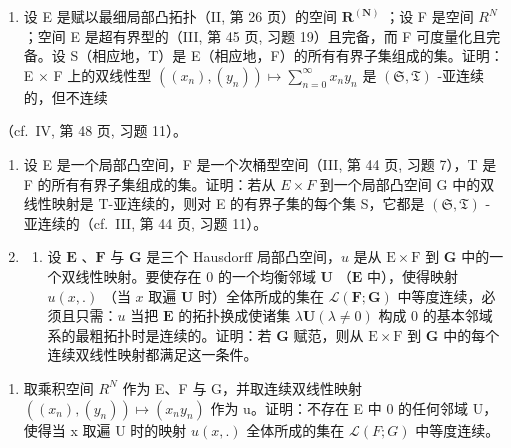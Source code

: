 \begin{enumerate}
\def\labelenumi{\arabic{enumi})}
\setcounter{enumi}{2}
\tightlist
\item
  设 E 是赋以最细局部凸拓扑（II, 第 26 页）的空间 \(\mathbf{R}^{(\mathbf{N})}\) ；设 F 是空间 \(R^{N}\) ；空间 E 是超有界型的（III, 第 45 页, 习题 19）且完备，而 F 可度量化且完备。设 S（相应地，T）是 E（相应地，F）的所有有界子集组成的集。证明：E × F 上的双线性型 \(((x_{n}), (y_{n})) \mapsto \sum_{n=0}^{\infty} x_{n} y_{n}\) 是 \((\mathfrak{S}, \mathfrak{T})\) -亚连续的，但不连续
\end{enumerate}

（cf.~IV, 第 48 页, 习题 11）。

\begin{enumerate}
\def\labelenumi{\arabic{enumi})}
\setcounter{enumi}{3}
\item
  设 E 是一个局部凸空间，F 是一个次桶型空间（III, 第 44 页, 习题 7），T 是 F 的所有有界子集组成的集。证明：若从 \(E \times F\) 到一个局部凸空间 G 中的双线性映射是 T-亚连续的，则对 E 的有界子集的每个集 S，它都是 \((\mathfrak{S}, \mathfrak{T})\) -亚连续的（cf.~III, 第 44 页, 习题 11）。
\item
  \begin{enumerate}
  \def\labelenumii{\alph{enumii})}
  \tightlist
  \item
    设 \(\mathbf{E}\) 、\(\mathbf{F}\) 与 \(\mathbf{G}\) 是三个 Hausdorff 局部凸空间，\(u\) 是从 \(\mathrm{E} \times \mathrm{F}\) 到 \(\mathbf{G}\) 中的一个双线性映射。要使存在 0 的一个均衡邻域 \(\mathbf{U}\) （\(\mathbf{E}\) 中），使得映射 \(u(x, .)\) （当 \(x\) 取遍 \(\mathbf{U}\) 时）全体所成的集在 \(\mathcal{L}(\mathbf{F}; \mathbf{G})\) 中等度连续，必须且只需：\(u\) 当把 \(\mathbf{E}\) 的拓扑换成使诸集 \(\lambda \mathbf{U} (\lambda \neq 0)\) 构成 0 的基本邻域系的最粗拓扑时是连续的。证明：若 \(\mathbf{G}\) 赋范，则从 \(\mathrm{E} \times \mathrm{F}\) 到 \(\mathbf{G}\) 中的每个连续双线性映射都满足这一条件。
  \end{enumerate}
\end{enumerate}

\begin{enumerate}
\def\labelenumi{\alph{enumi})}
\setcounter{enumi}{1}
\tightlist
\item
  取乘积空间 \(R^{N}\) 作为 E、F 与 G，并取连续双线性映射 \(((x_{n}), (y_{n})) \mapsto (x_{n}y_{n})\) 作为 u。证明：不存在 E 中 0 的任何邻域 U，使得当 x 取遍 U 时的映射 \(u(x, .)\) 全体所成的集在 \(\mathcal{L}(F; G)\) 中等度连续。
\end{enumerate}

